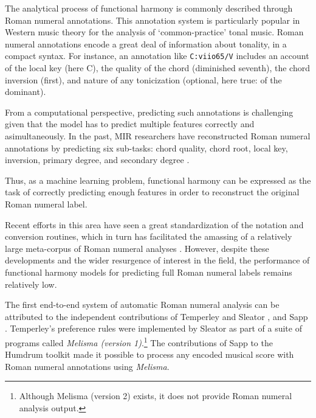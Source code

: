 
The analytical process of functional harmony is commonly
described through Roman numeral annotations. This annotation
system is particularly popular in Western music theory for
the analysis of `common-practice' tonal music. Roman numeral
annotations encode a great deal of information about
tonality, in a compact syntax. For instance, an annotation
like  \texttt{C:viio65/V} includes an account of the local
key (here C), the quality of the chord (diminished seventh),
the chord inversion (first), and nature of any tonicization
(optional, here true: of the dominant).

From a computational perspective, predicting such
annotations is challenging given that the model has to
predict multiple features correctly and asimultaneously. In
the past, MIR researchers have reconstructed Roman numeral
annotations by predicting six sub-tasks: chord quality,
chord root, local key, inversion, primary degree, and
secondary degree \parencite{chen2018functional, micchi2020not}.

Thus, as a machine learning problem, functional harmony can
be expressed as the task of correctly predicting enough
features in order to reconstruct the original Roman numeral
label.

Recent efforts in this area have seen a great
standardization of the notation and conversion routines,
\parencite{gotham2019romantext} which in turn has facilitated the
amassing of a relatively large meta-corpus of Roman numeral
analyses \parencite{gotham2019romantext}. However, despite these
developments and the wider resurgence of interest in the
field, the performance of functional harmony models for
predicting full Roman numeral labels remains relatively low.


The first end-to-end system of automatic Roman numeral
analysis can be attributed to the independent contributions
of Temperley and Sleator \parencite{temperley2004cognition}, and
Sapp \parencite{sapp2009tsroot}. Temperley's preference rules
were implemented by Sleator as part of a suite of programs
called \emph{Melisma (version 1)}.\footnote{Although Melisma
(version 2) exists, it does not provide Roman numeral
analysis output.} The contributions of Sapp to the Humdrum
toolkit \parencite{huron2002music} made it possible to process
any encoded musical score with Roman numeral annotations
using \emph{Melisma}.

